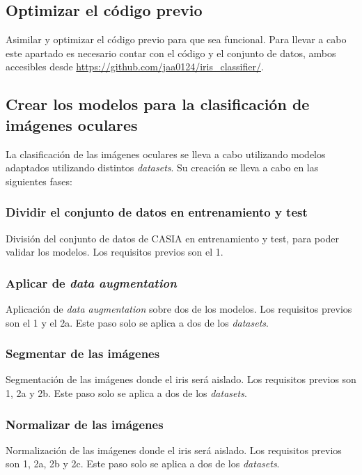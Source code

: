 \subsection{Optimizar el código previo}

Asimilar y optimizar el código previo para que sea funcional. Para llevar a cabo este apartado es necesario contar con el código y el conjunto de datos, ambos accesibles desde \url{https://github.com/jaa0124/iris_classifier/}.

\subsection{Crear los modelos para la clasificación de imágenes oculares}

La clasificación de las imágenes oculares se lleva a cabo utilizando modelos adaptados utilizando distintos \textit{datasets}. Su creación se lleva a cabo en las siguientes fases:

\subsubsection{Dividir el conjunto de datos en entrenamiento y test}

División del conjunto de datos de CASIA en entrenamiento y test, para poder validar los modelos. Los requisitos previos son el 1.

\subsubsection{Aplicar de \textit{data augmentation}}

Aplicación de \textit{data augmentation} sobre dos de los modelos. Los requisitos previos son el 1 y el 2a. Este paso solo se aplica a dos de los \textit{datasets}.

\subsubsection{Segmentar de las imágenes}

Segmentación de las imágenes donde el iris será aislado. Los requisitos previos son 1, 2a y 2b. Este paso solo se aplica a dos de los \textit{datasets}.

\subsubsection{Normalizar de las imágenes}

Normalización de las imágenes donde el iris será aislado. Los requisitos previos son 1, 2a, 2b y 2c. Este paso solo se aplica a dos de los \textit{datasets}.

